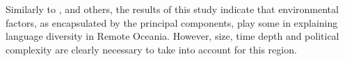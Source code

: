 \documentclass[unnumsec,webpdf,modern,medium]{oup-authoring-template}
\begin{document}

Similarly to \citet{gavin2012island}, \citet{hua2019ecological} and others, the results of this study indicate that environmental factors, as encapsulated by the principal components, play some in explaining language diversity in Remote Oceania. However, size, time depth and political complexity are clearly necessary to take into account for this region.



\end{document}
